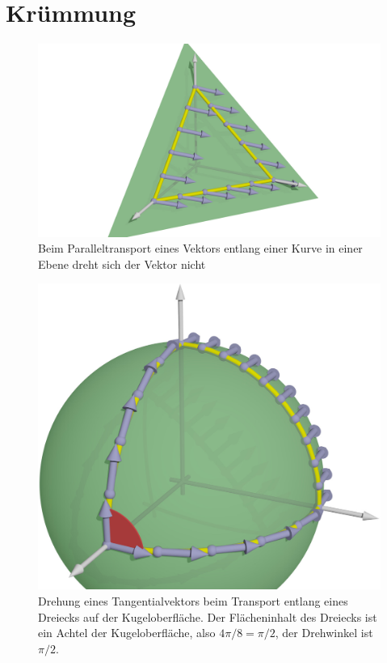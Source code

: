 %
%
%
\section{Krümmung
\label{skript:kruemmung:section:kruemmung}}

\begin{figure}
\centering
\includegraphics[width=\hsize]{chapters/3d/flach.jpg}
\caption{Beim Paralleltransport eines Vektors entlang einer Kurve in
einer Ebene dreht sich der Vektor nicht
\label{skript:kruemmung:transportflach}}
\end{figure}

\begin{figure}
\centering
\includegraphics[width=\hsize]{chapters/3d/sphere.jpg}
\caption{Drehung eines Tangentialvektors beim Transport entlang eines
Dreiecks auf der Kugeloberfläche.
Der Flächeninhalt des Dreiecks ist ein Achtel der Kugeloberfläche,
also $4\pi/8=\pi/2$, der Drehwinkel ist $\pi/2$.
\label{skript:kruemmung:transportkugel}}
\end{figure}

